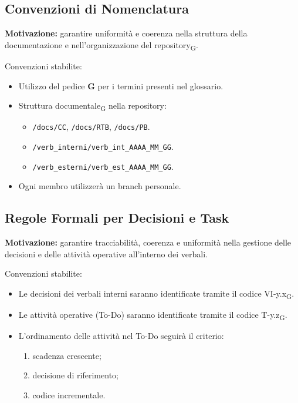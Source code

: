 \subsection{Convenzioni di Nomenclatura}
\textbf{Motivazione:} garantire uniformità e coerenza nella struttura della documentazione e nell’organizzazione del repository\textsubscript{G}.

Convenzioni stabilite:
\begin{itemize}
    \item Utilizzo del pedice \textbf{G} per i termini presenti nel glossario.
    \item Struttura documentale\textsubscript{G} nella repository:
    \begin{itemize}
        \item \texttt{/docs/CC}, \texttt{/docs/RTB}, \texttt{/docs/PB}.
        \item \texttt{/verb\_interni/verb\_int\_AAAA\_MM\_GG}.
        \item \texttt{/verb\_esterni/verb\_est\_AAAA\_MM\_GG}.
    \end{itemize}
    \item Ogni membro utilizzerà un branch personale.
\end{itemize}

\subsection{Regole Formali per Decisioni e Task}
\textbf{Motivazione:} garantire tracciabilità, coerenza e uniformità nella gestione delle decisioni e delle attività operative all’interno dei verbali.

Convenzioni stabilite:
\begin{itemize}
    \item Le decisioni dei verbali interni saranno identificate tramite il codice VI-y.x\textsubscript{G}.
    \item Le attività operative (To-Do) saranno identificate tramite il codice T-y.z\textsubscript{G}.
    \item L’ordinamento delle attività nel To-Do seguirà il criterio:
    \begin{enumerate}
        \item scadenza crescente;
        \item decisione di riferimento;
        \item codice incrementale.
    \end{enumerate}
\end{itemize}

